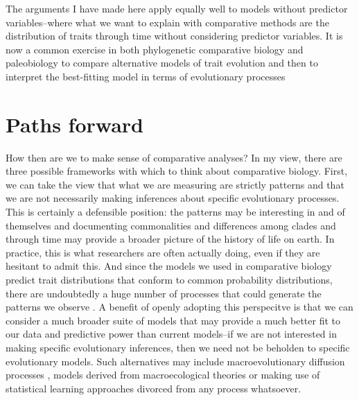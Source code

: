 The arguments I have made here apply equally well to models without predictor variables--where what we want to explain with comparative methods are the distribution of traits through time without considering predictor variables. It is now a common exercise in both phylogenetic comparative biology and paleobiology to compare alternative models of trait evolution and then to interpret the best-fitting model in terms of evolutionary processes \citep[e.g.,][]{Mooers1999, Hunt2007, Harmon2010, Hopkins2012, Burbrink2012, Hunt2012}

\section{Paths forward}

How then are we to make sense of comparative analyses? In my view, there are three possible frameworks with which to think about comparative biology. First, we can take the view that what we are measuring are strictly patterns and that we are not necessarily making inferences about specific evolutionary processes. This is certainly a defensible position: the patterns may be interesting in and of themselves and documenting commonalities and differences among clades and through time may provide a broader picture of the history of life on earth. In practice, this is what researchers are often actually doing, even if they are hesitant to admit this. And since the models we used in comparative biology predict trait distributions that conform to common probability distributions, there are undoubtedly a huge number of processes that could generate the patterns we observe \citep{Jaynes2003, Frank2009, Frank2014}.
A benefit of openly adopting this perspecitve is that we can consider a much broader suite of models that may provide a much better fit to our data and predictive power than current models--if we are not interested in making specific evolutionary inferences, then we need not be beholden to specific evolutionary models. Such alternatives may include macroevolutionary diffusion processes \citep[e.g.,][]{Clauset2008}, models derived from macroecological theories \citep{Brown2004, Harte2011} or making use of statistical learning approaches divorced from any process whatsoever.

